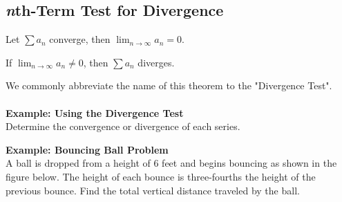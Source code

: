 \subsection*{\textit{n}th-Term Test for Divergence}
\begin{tcolorbox}[title= LIMIT OF THE nTH TERM OF A SERIES,colframe=black,sharp corners,colback=white,colbacktitle=white,coltitle=black]

    \begin{center}
    Let $\displaystyle\sum a_n$ converge, then $\displaystyle\lim_{n\to\infty}a_n=0$.
    
    
    If $\displaystyle\lim_{n\to\infty}a_n\ne0$, then $\displaystyle\sum a_n$  diverges.
    \end{center}
    
\end{tcolorbox}
We commonly abbreviate the name of this theorem to the "Divergence Test".\\
\\
\noindent\textbf{Example: Using the Divergence Test}\\
Determine the convergence or divergence of each series.

\noindent\textbf{Example: Bouncing Ball Problem}\\
A ball is dropped from a height of 6 feet and begins bouncing as shown in the figure below. The height of each bounce is three-fourths the height of the previous bounce. Find the total vertical distance traveled by the ball.


